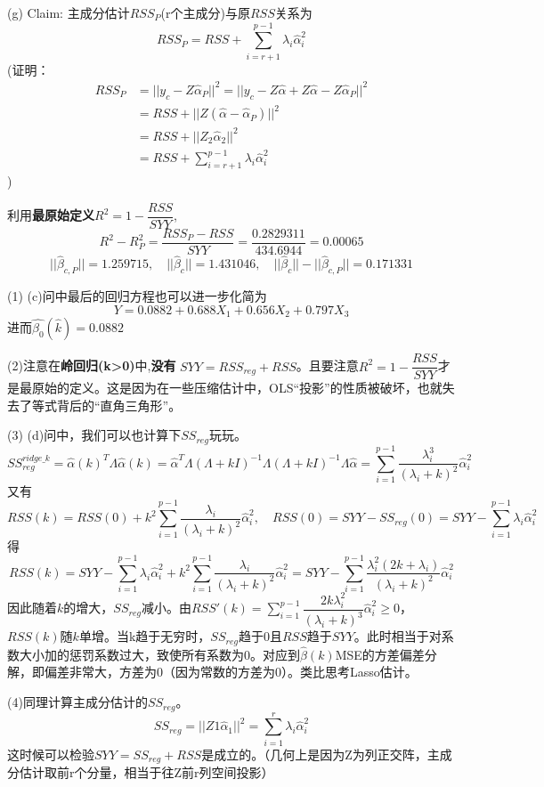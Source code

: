 \documentclass[cn,hazy,green,12pt,normal]{elegantnote}
\numberwithin{equation}{section}
\numberwithin{subsection}{section}
\begin{document}
\noindent (g) 
Claim:
主成分估计$RSS_P$(r个主成分)与原$RSS$关系为
\[RSS_P = RSS + \sum_{i = r+1}^{p-1}\lambda_i \hat{\alpha}_i^2\]
(证明：
\begin{align*}
    RSS_P &= ||y_c - Z\hat{\alpha}_P ||^2 = ||y_c -Z\hat{\alpha} +Z\hat{\alpha} - Z\hat{\alpha}_P||^2\\
    & = RSS + ||Z(\hat{\alpha}- \hat{\alpha}_P)||^2\\
    & = RSS + ||Z_2\hat{\alpha}_2||^2\\
    & = RSS + \sum_{i = r+1}^{p-1}\lambda_i \hat{\alpha}_i^2
\end{align*})

利用\textbf{最原始定义}$R^2 = 1- \dfrac{RSS}{SYY}$,
\[R^2 - R_P^2 = \dfrac{RSS_P - RSS}{SYY} = \dfrac{0.2829311}{434.6944}=0.00065 \]
\[||\hat{\beta}_{c,P}|| = 1.259715, \quad ||\hat{\beta}_c|| = 1.431046, \quad ||\hat{\beta}_c||- ||\hat{\beta}_{c,P}|| = 0.171331 \]

\begin{note}
    (1) (c)问中最后的回归方程也可以进一步化简为\[Y = 0.0882 + 0.688X_1+0.656X_2+0.797X_3\]进而$\hat{\beta_0}(\hat{k}) = 0.0882$

    \noindent(2)注意在\textbf{岭回归(k>0)}中,\textbf{没有} $SYY = RSS_{reg} + RSS$。且要注意$R^2 = 1- \dfrac{RSS}{SYY}$才是最原始的定义。这是因为在一些压缩估计中，OLS“投影”的性质被破坏，也就失去了等式背后的“直角三角形”。
    
  \noindent  (3) (d)问中，我们可以也计算下$SS_{reg}$玩玩。\[SS^{ridge\_k}_{reg} = \hat{\alpha}(k)^T\Lambda \hat{\alpha}(k) = \hat{\alpha}^T\Lambda(\Lambda + kI)^{-1}\Lambda (\Lambda + kI)^{-1}\Lambda \hat{\alpha} = \sum_{i=1}^{p-1} \dfrac{\lambda_i^3}{(\lambda_i + k)^2}\hat{\alpha}_i^2 \]
  又有
  \[RSS(k) = RSS(0) + k^2\sum_{i = 1}^{p-1}\dfrac{\lambda_i}{(\lambda_i + k)^2}\hat{\alpha}_i^2, \quad RSS(0) = SYY - SS_{reg} (0) = SYY-\sum_{i = 1}^{p-1}\lambda_i\hat{\alpha}_i^2\]
  得
  \[RSS(k) = SYY-\sum_{i = 1}^{p-1}\lambda_i\hat{\alpha}_i^2+k^2\sum_{i = 1}^{p-1}\dfrac{\lambda_i}{(\lambda_i + k)^2}\hat{\alpha}_i^2=SYY - \sum_{i = 1}^{p-1}\dfrac{\lambda_i^2(2k+\lambda_i)}{(\lambda_i + k)^2}\hat{\alpha}_i^2\]
  因此随着$k$的增大，$SS_{reg}$减小。由$RSS'(k) = \sum_{i = 1}^{p-1} \dfrac{2k\lambda_i^2}{(\lambda_i + k)^3}\hat{\alpha}_i^2 \ge 0$，$RSS(k)$随$k$单增。当k趋于无穷时，$SS_{reg}$趋于0且$RSS$趋于$SYY$。此时相当于对系数大小加的惩罚系数过大，致使所有系数为0。对应到$\hat{\beta}(k)$MSE的方差偏差分解，即偏差非常大，方差为0（因为常数的方差为0）。类比思考Lasso估计。

  \noindent (4)同理计算主成分估计的$SS_{reg}$。
  \[SS_{reg} = ||Z1\hat{\alpha}_1||^2 = \sum_{i = 1}^r \lambda_i \hat{\alpha}_i^2\]
  这时候可以检验$SYY = SS_{reg} + RSS$是成立的。（几何上是因为Z为列正交阵，主成分估计取前r个分量，相当于往Z前r列空间投影）
\end{note}
\end{document}
